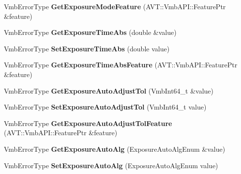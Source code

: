 \begin{DoxyCompactItemize}
\item 
\hypertarget{classMakoCamera_a6ae3900b37a91a911a4494e9ea37045f}{Vmb\-Error\-Type {\bfseries Get\-Exposure\-Mode\-Feature} (A\-V\-T\-::\-Vmb\-A\-P\-I\-::\-Feature\-Ptr \&feature)}\label{classMakoCamera_a6ae3900b37a91a911a4494e9ea37045f}

\item 
\hypertarget{classMakoCamera_a6fbe9e8c6b884f2dfaefe4118d15ac8b}{Vmb\-Error\-Type {\bfseries Get\-Exposure\-Time\-Abs} (double \&value)}\label{classMakoCamera_a6fbe9e8c6b884f2dfaefe4118d15ac8b}

\item 
\hypertarget{classMakoCamera_ae63245643584cb86ea51ecfe1da68779}{Vmb\-Error\-Type {\bfseries Set\-Exposure\-Time\-Abs} (double value)}\label{classMakoCamera_ae63245643584cb86ea51ecfe1da68779}

\item 
\hypertarget{classMakoCamera_ab815546c3e113456a88c8daffbc4d69f}{Vmb\-Error\-Type {\bfseries Get\-Exposure\-Time\-Abs\-Feature} (A\-V\-T\-::\-Vmb\-A\-P\-I\-::\-Feature\-Ptr \&feature)}\label{classMakoCamera_ab815546c3e113456a88c8daffbc4d69f}

\item 
\hypertarget{classMakoCamera_af0f253cba2a87c81563dd54ba7b91c1b}{Vmb\-Error\-Type {\bfseries Get\-Exposure\-Auto\-Adjust\-Tol} (Vmb\-Int64\-\_\-t \&value)}\label{classMakoCamera_af0f253cba2a87c81563dd54ba7b91c1b}

\item 
\hypertarget{classMakoCamera_a662a32c8804160451e12d18a6f62c020}{Vmb\-Error\-Type {\bfseries Set\-Exposure\-Auto\-Adjust\-Tol} (Vmb\-Int64\-\_\-t value)}\label{classMakoCamera_a662a32c8804160451e12d18a6f62c020}

\item 
\hypertarget{classMakoCamera_a7adef4006a3852a96fc65b8e37a8e255}{Vmb\-Error\-Type {\bfseries Get\-Exposure\-Auto\-Adjust\-Tol\-Feature} (A\-V\-T\-::\-Vmb\-A\-P\-I\-::\-Feature\-Ptr \&feature)}\label{classMakoCamera_a7adef4006a3852a96fc65b8e37a8e255}

\item 
\hypertarget{classMakoCamera_aaf4f82829831e96a3b07707c3c55daae}{Vmb\-Error\-Type {\bfseries Get\-Exposure\-Auto\-Alg} (Exposure\-Auto\-Alg\-Enum \&value)}\label{classMakoCamera_aaf4f82829831e96a3b07707c3c55daae}

\item 
\hypertarget{classMakoCamera_a0ef27580a897c7a5f070e98f83ccc5fd}{Vmb\-Error\-Type {\bfseries Set\-Exposure\-Auto\-Alg} (Exposure\-Auto\-Alg\-Enum value)}\label{classMakoCamera_a0ef27580a897c7a5f070e98f83ccc5fd}


\end{DoxyCompactItemize}

